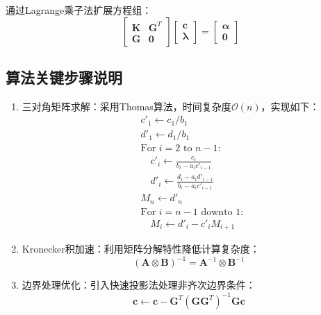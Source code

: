 通过Lagrange乘子法扩展方程组：
\begin{equation}
    \begin{bmatrix}
        \mathbf{K} & \mathbf{G}^T \\
        \mathbf{G} & \mathbf{0}
    \end{bmatrix}
    \begin{bmatrix}
        \mathbf{c} \\
        \boldsymbol{\lambda}
    \end{bmatrix}
    =
    \begin{bmatrix}
        \boldsymbol{\alpha} \\
        \mathbf{0}
    \end{bmatrix}
\end{equation}
\subsection{算法关键步骤说明}
\begin{enumerate}
    \item{三对角矩阵求解}：采用Thomas算法，时间复杂度$\mathcal{O}(n)$，实现如下：
    \begin{align}
        &c'_1 \leftarrow c_1 / b_1 \nonumber\\
        &d'_1 \leftarrow d_1 / b_1 \nonumber\\
        &\text{For } i=2 \text{ to } n-1: \nonumber\\
        &\quad c'_i \leftarrow \frac{c_i}{b_i - a_i c'_{i-1}} \nonumber\\
        &\quad d'_i \leftarrow \frac{d_i - a_i d'_{i-1}}{b_i - a_i c'_{i-1}} \nonumber\\
        &M_n \leftarrow d'_n \nonumber\\
        &\text{For } i=n-1 \text{ downto } 1: \nonumber\\
        &\quad M_i \leftarrow d'_i - c'_i M_{i+1}
    \end{align}

    \item{Kronecker积加速}：利用矩阵分解特性降低计算复杂度：
    \begin{equation}
        (\mathbf{A} \otimes \mathbf{B})^{-1} = \mathbf{A}^{-1} \otimes \mathbf{B}^{-1}
    \end{equation}

    \item{边界处理优化}：引入快速投影法处理非齐次边界条件：
    \begin{equation}
        \mathbf{c} \leftarrow \mathbf{c} - \mathbf{G}^T(\mathbf{G}\mathbf{G}^T)^{-1}\mathbf{G}\mathbf{c}
    \end{equation}
\end{enumerate}
